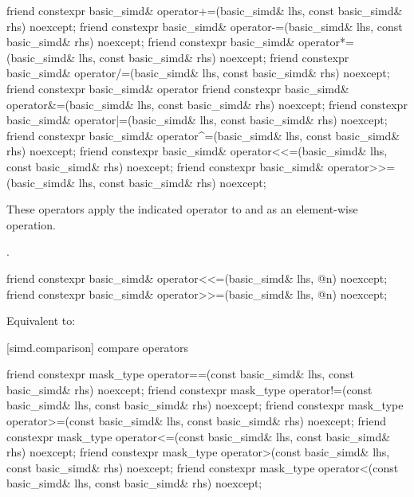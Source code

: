 \begin{itemdecl}
friend constexpr basic_simd& operator+=(basic_simd& lhs, const basic_simd& rhs) noexcept;
friend constexpr basic_simd& operator-=(basic_simd& lhs, const basic_simd& rhs) noexcept;
friend constexpr basic_simd& operator*=(basic_simd& lhs, const basic_simd& rhs) noexcept;
friend constexpr basic_simd& operator/=(basic_simd& lhs, const basic_simd& rhs) noexcept;
friend constexpr basic_simd& operator%
friend constexpr basic_simd& operator&=(basic_simd& lhs, const basic_simd& rhs) noexcept;
friend constexpr basic_simd& operator|=(basic_simd& lhs, const basic_simd& rhs) noexcept;
friend constexpr basic_simd& operator^=(basic_simd& lhs, const basic_simd& rhs) noexcept;
friend constexpr basic_simd& operator<<=(basic_simd& lhs, const basic_simd& rhs) noexcept;
friend constexpr basic_simd& operator>>=(basic_simd& lhs, const basic_simd& rhs) noexcept;
\end{itemdecl}

\begin{itemdescr}
  \pnum\ConstraintOperatorTWellFormed

  \pnum\effects
  These operators apply the indicated operator to  and  as an element-wise operation.

  \pnum\returns
  .
\end{itemdescr}

\begin{itemdecl}
friend constexpr basic_simd& operator<<=(basic_simd& lhs, @\simdsizetype@ n) noexcept;
friend constexpr basic_simd& operator>>=(basic_simd& lhs, @\simdsizetype@ n) noexcept;
\end{itemdecl}

\begin{itemdescr}
  \pnum\ConstraintOperatorTWellFormed

  \pnum\effects
  Equivalent to: 
\end{itemdescr}

[simd.comparison]{ compare operators}

\begin{itemdecl}
friend constexpr mask_type operator==(const basic_simd& lhs, const basic_simd& rhs) noexcept;
friend constexpr mask_type operator!=(const basic_simd& lhs, const basic_simd& rhs) noexcept;
friend constexpr mask_type operator>=(const basic_simd& lhs, const basic_simd& rhs) noexcept;
friend constexpr mask_type operator<=(const basic_simd& lhs, const basic_simd& rhs) noexcept;
friend constexpr mask_type operator>(const basic_simd& lhs, const basic_simd& rhs) noexcept;
friend constexpr mask_type operator<(const basic_simd& lhs, const basic_simd& rhs) noexcept;
\end{itemdecl}

